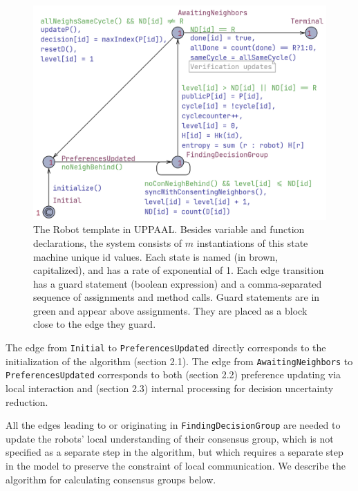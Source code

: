 \begin{figure}[H]
    \centering
    \includegraphics[width=\linewidth]{pictures/Model screenshot 2025-05-11.png}
    \caption{The Robot template in UPPAAL. Besides variable and function declarations, the system consists of $m$ instantiations of this state machine unique id values. Each state is named (in brown, capitalized), and has a rate of exponential of 1. Each edge transition has a guard statement (boolean expression) and a comma-separated sequence of assignments and method calls. Guard statements are in green and appear above assignments. They are placed as a block close to the edge they guard.}
    \label{fig:model}
\end{figure}

The edge from \texttt{Initial} to \texttt{PreferencesUpdated} directly corresponds to the initialization of the algorithm (section 2.1).
The edge from \texttt{AwaitingNeighbors} to \texttt{PreferencesUpdated} corresponds to both (section 2.2) preference updating via local interaction and (section 2.3) internal processing for decision uncertainty reduction.

All the edges leading to or originating in \texttt{FindingDecisionGroup} are needed to update the robots' local understanding of their consensus group, which is not specified as a separate step in the algorithm, but which requires a separate step in the model to preserve the constraint of local communication. We describe the algorithm for calculating consensus groups below.

